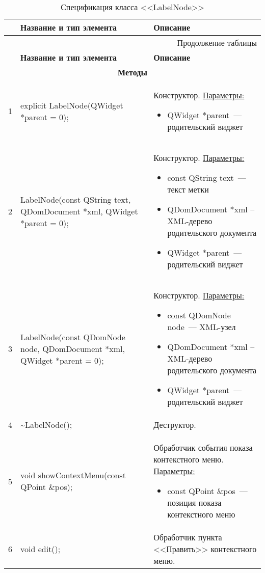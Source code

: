 \small
\singlespacing
\begin{longtable}[h]{|p{}|p{}|p{}|}
  \caption{Спецификация класса <<LabelNode>>}
	\\ \hline
	  \textbf{\No}                  &
	  \textbf{Название и тип элемента}  &
	  \textbf{Описание}
	\\ \hline
  \endfirsthead

  \multicolumn{3}{r}{Продолжение таблицы \thetable{}}
  \\ \hline
	  \textbf{\No}                  &
	  \textbf{Название и тип элемента}  &
	  \textbf{Описание}
	\\ \hline
  \endhead

  \multicolumn{3}{|c|}{\textbf{Методы}} \\
  \hline
  1 & explicit LabelNode(QWidget *parent = 0); &
    Конструктор.\newline
    \uline{Параметры:}
    \begin{itemize}[nolistsep,label=,leftmargin=0cm]
      \item QWidget *parent~--- родительский виджет
    \end{itemize}\\ \hline
  2 & LabelNode(const QString  text, QDomDocument *xml, QWidget *parent = 0); &
    Конструктор.\newline
    \uline{Параметры:}
    \begin{itemize}[nolistsep,label=,leftmargin=0cm]
      \item const QString  text~--- текст метки
      \item QDomDocument *xml -- XML-дерево родительского документа
      \item QWidget *parent~--- родительский виджет
    \end{itemize}\\ \hline
  3 & LabelNode(const QDomNode node, QDomDocument *xml, QWidget *parent = 0); &
    Конструктор.\newline
    \uline{Параметры:}
    \begin{itemize}[nolistsep,label=,leftmargin=0cm]
      \item const QDomNode node~--- XML-узел
      \item QDomDocument *xml -- XML-дерево родительского документа
      \item QWidget *parent~--- родительский виджет
    \end{itemize}\\ \hline
  4 & \textasciitilde LabelNode(); & Деструктор. \\ \hline
  5 & void showContextMenu(const QPoint \&pos); & Обработчик события показа контекстного меню.\newline
    \uline{Параметры:}
    \begin{itemize}[nolistsep,label=,leftmargin=0cm]
      \item const QPoint \&pos~--- позиция показа контекстного меню
    \end{itemize}\\ \hline
  6 & void edit(); & Обработчик пункта <<Править>> контекстного меню.\\ \hline
\end{longtable}
\normalsize
\onehalfspacing


